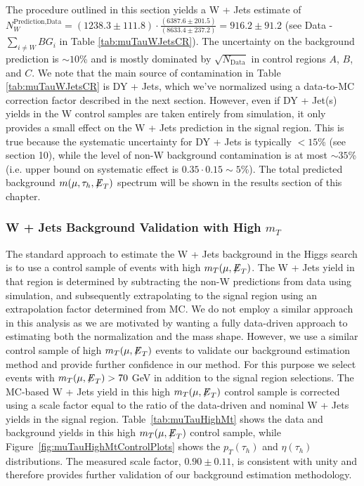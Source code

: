 The procedure outlined in this section yields a W + Jets estimate of $N_{W}^{\textrm{Prediction,Data}} = (1238.3 \pm 111.8) \cdot \frac{(6387.6 
\pm 201.5)}{(8633.4 \pm 237.2)} = 916.2 \pm 91.2$ (see Data - $\sum\limits_{i\neq W} BG_{i}$ in Table \ref{tab:muTauWJetsCR}). The uncertainty on the 
background prediction is $\sim 10$\% and is mostly dominated by $\sqrt{N_{\textrm{Data}}}$ in control regions $A$, $B$, and $C$. We note that the main source of 
contamination in Table \ref{tab:muTauWJetsCR} is DY + Jets, which we've normalized using a data-to-MC correction factor described in the next section. However, 
even if DY + Jet(s) yields in the W control samples are taken entirely from simulation, it only provides a small effect on the W + Jets prediction in the signal region. This is true 
because the systematic uncertainty for DY + Jets is typically $< 15$\% (see section 10), while the level of non-W background contamination is at most $\sim 35$\% 
(i.e. upper bound on systematic effect is $0.35 \cdot 0.15 \sim 5$\%). The total predicted background
$m(\mu,\tau_{h},{\not\mathrel{E}}_T)$ spectrum will be shown in the results section of this chapter.

\subsubsection{W + Jets Background Validation with High $m_T$}

The standard approach to estimate the W + Jets background in the Higgs search is to use a control sample of events with high $m_{T}(\mu,{\not\mathrel{E}}_T)$.
The W + Jets yield in that region is determined by subtracting the non-W predictions from data using simulation, and subsequently extrapolating to the 
signal region using an extrapolation factor determined from MC. We do not employ a similar approach in this analysis as we are motivated by wanting a fully 
data-driven approach to estimating both the normalization and the mass shape. However, we use a similar control sample of high $m_{T}(\mu,{\not\mathrel{E}}_T)$ events to 
validate our background estimation method and provide further confidence in our method. For this purpose we select events with $m_{T}(\mu,{\not\mathrel{E}}_T) > 70$ GeV in 
addition to the signal region selections. The MC-based W + Jets yield in this high $m_{T}(\mu,{\not\mathrel{E}}_T)$ control sample is corrected using a scale factor equal to the 
ratio of the data-driven and nominal W + Jets yields in the signal region. Table~\ref{tab:muTauHighMt} shows the data and background yields in this high 
$m_{T}(\mu,{\not\mathrel{E}}_T)$ control sample, while Figure~\ref{fig:muTauHighMtControlPlots} shows the $p_{T}(\tau_{h})$ and $\eta(\tau_{h})$ distributions. The measured 
scale factor, $0.90 \pm 0.11$, is consistent with unity and therefore provides further validation of our background estimation methodology.


